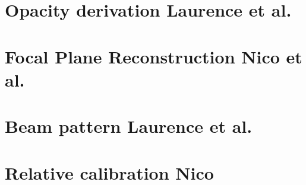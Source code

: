 \documentclass[a4paper, 11pt]{report}
\begin{document}
\clearpage
\chapter{Opacity derivation {\color{YellowGreen} Laurence et al.}}
\label{se:opacities}


\clearpage
\chapter{Focal Plane Reconstruction {\color{blue} Nico et al.}}
\label{se:fp_reconstruction}



\clearpage
\chapter{Beam pattern {\color{blue} Laurence et al.} }
\label{se:beams}

%


\clearpage
\chapter{Relative calibration {\color{blue} Nico} }
\label{se:flat_field}



\clearpage
\end{document}
